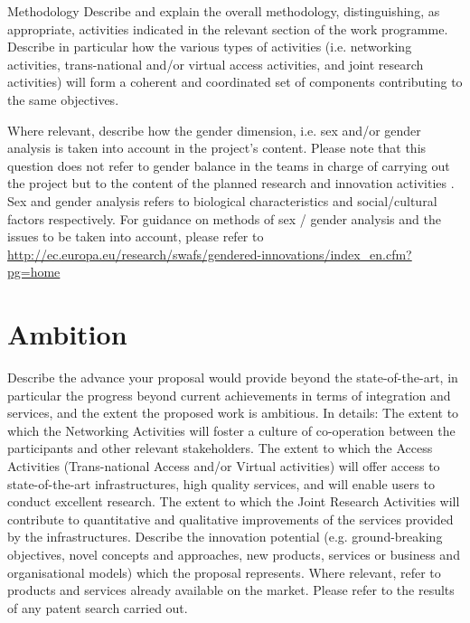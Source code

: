 \begin{todo}{Methodology}\color{red}
  Describe and explain the overall methodology, distinguishing, as appropriate, activities indicated in the relevant section of the work programme. Describe in particular how the various types of activities (i.e. networking activities, trans-national and/or virtual access activities, and joint research activities) will form a coherent and coordinated set of components contributing to the same objectives.

  Where relevant, describe how the gender dimension, i.e. sex and/or gender analysis is taken into account in the project’s content.
  Please note that this question does not refer to gender balance in the teams in charge of carrying out the project but to the content of the planned research and innovation activities . Sex and gender analysis refers to biological characteristics and social/cultural factors respectively. For guidance on methods of sex / gender analysis and the issues to be taken into account, please refer to \url{http://ec.europa.eu/research/swafs/gendered-innovations/index_en.cfm?pg=home} 
\end{todo}



\section{Ambition}

\begin{todo}{}\color{red}
  Describe the advance your proposal would provide beyond the state-of-the-art, in particular the progress beyond current achievements in terms of integration and services, and the extent the proposed work is ambitious. In details:
The extent to which the Networking Activities will foster a culture of co-operation between the participants and other relevant stakeholders.
The extent to which the Access Activities (Trans-national Access and/or Virtual activities) will offer access to state-of-the-art infrastructures, high quality services, and will enable users to conduct excellent research.
The extent to which the Joint Research Activities will contribute to quantitative and qualitative improvements of the services provided by the infrastructures.
Describe the innovation potential (e.g. ground-breaking objectives, novel concepts and approaches, new products, services or business and organisational models) which the proposal represents. Where relevant, refer to products and services already available on the market. Please refer to the results of any patent search carried out.
\end{todo}









